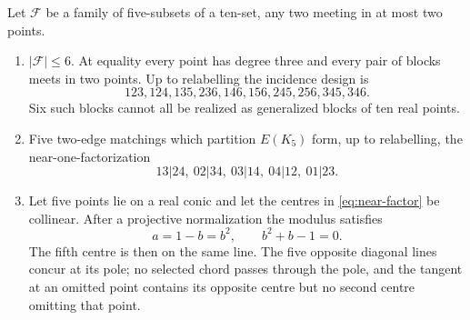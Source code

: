 \begin{lemma}\label{lem:pentagon-golden}
Let $\mathcal F$ be a family of five-subsets of a ten-set, any two meeting
in at most two points.
\begin{enumerate}[label=\textup{(P\arabic*)}]
\item $|\mathcal F|\le6$.  At equality every point has degree three and
every pair of blocks meets in two points.  Up to relabelling the incidence
design is
\begin{equation}
 123,124,135,236,146,156,245,256,345,346.\label{eq:pentagon-design}
\end{equation}
Six such blocks cannot all be realized as generalized blocks of ten real
points.
\item Five two-edge matchings which partition $E(K_5)$ form, up to
relabelling, the near-one-factorization
\begin{equation}
 13|24,\ 02|34,\ 03|14,\ 04|12,\ 01|23.\label{eq:near-factor}
\end{equation}
\item Let five points lie on a real conic and let the centres in
\eqref{eq:near-factor} be collinear.  After a projective normalization the
modulus satisfies
\begin{equation}
 a=1-b=b^2,\qquad b^2+b-1=0.\label{eq:golden}
\end{equation}
The fifth centre is then on the same line.  The five opposite diagonal
lines concur at its pole; no selected chord passes through the pole, and
the tangent at an omitted point contains its opposite centre but no second
centre omitting that point.
\end{enumerate}
\end{lemma}

